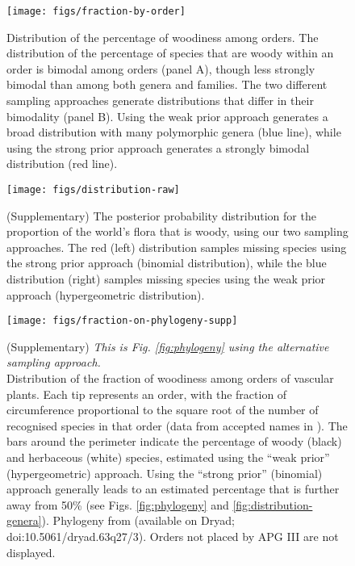 \documentclass[a4paper,12pt]{article}
\begin{document}
\begin{figure}[p]
  \centering
  \texttt{[image: figs/fraction-by-order]}
  \caption{Distribution of the percentage of woodiness among orders.
    The distribution of the percentage of species that are woody within
    an order is bimodal among orders (panel A), though
    less strongly bimodal than among both genera and families.
    The two different sampling approaches generate distributions that
    differ in their bimodality (panel B).  Using the weak prior
    approach generates a broad distribution with many polymorphic
    genera (blue line), while using the strong prior approach
    generates a strongly bimodal distribution (red line).}
  \label{fig:distribution-order}
\end{figure}

\begin{figure}[p]
  \centering
  \texttt{[image: figs/distribution-raw]}
  \caption{(Supplementary) The posterior probability distribution for
    the proportion of the world's flora that is woody, using our two
    sampling approaches.  The red (left) distribution samples missing
    species using the strong prior approach (binomial distribution),
    while the blue distribution (right) samples missing species using
    the weak prior approach (hypergeometric distribution).}
  \label{fig:distribution-raw}
\end{figure}

\begin{figure}[p]
  \centering
  \texttt{[image: figs/fraction-on-phylogeny-supp]}

  \caption{(Supplementary)
    \textit{This is Fig. \ref{fig:phylogeny} using the alternative
      sampling approach.}\\
    Distribution of the fraction of woodiness among orders of vascular
    plants.  Each tip represents an order, with the fraction of
    circumference proportional to the square root of the number of
    recognised species in that order (data from accepted names in
    \citet{ThePlantList}).  The bars around the perimeter indicate the
    percentage of woody (black) and herbaceous (white) species,
    estimated using the ``weak prior'' (hypergeometric) approach.
    Using the ``strong prior'' (binomial) approach generally leads to
    an estimated percentage that is further away from 50\% (see
    Figs. \ref{fig:phylogeny} and \ref{fig:distribution-genera}).
    Phylogeny from \citet{Zanne} (available on Dryad; 
    doi:10.5061/dryad.63q27/3). Orders not placed by APG III
    \citep{APG3} are not displayed.}
  \label{fig:phylogeny-supp}
\end{figure}
\end{document}
